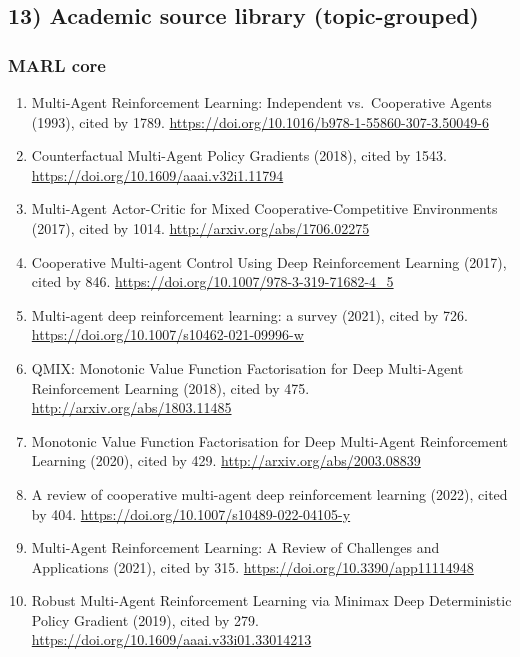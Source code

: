 \documentclass[11pt]{article}
\begin{document}
\hypertarget{academic-source-library-topic-grouped}{%
\subsection{13) Academic source library
(topic-grouped)}\label{academic-source-library-topic-grouped}}

\hypertarget{marl-core}{%
\subsubsection{MARL core}\label{marl-core}}

\begin{enumerate}
\def\labelenumi{\arabic{enumi}.}
\tightlist
\item
  Multi-Agent Reinforcement Learning: Independent vs.~Cooperative Agents
  (1993), cited by 1789.
  \url{https://doi.org/10.1016/b978-1-55860-307-3.50049-6}
\item
  Counterfactual Multi-Agent Policy Gradients (2018), cited by 1543.
  \url{https://doi.org/10.1609/aaai.v32i1.11794}
\item
  Multi-Agent Actor-Critic for Mixed Cooperative-Competitive
  Environments (2017), cited by 1014.
  \url{http://arxiv.org/abs/1706.02275}
\item
  Cooperative Multi-agent Control Using Deep Reinforcement Learning
  (2017), cited by 846.
  \url{https://doi.org/10.1007/978-3-319-71682-4_5}
\item
  Multi-agent deep reinforcement learning: a survey (2021), cited by
  726. \url{https://doi.org/10.1007/s10462-021-09996-w}
\item
  QMIX: Monotonic Value Function Factorisation for Deep Multi-Agent
  Reinforcement Learning (2018), cited by 475.
  \url{http://arxiv.org/abs/1803.11485}
\item
  Monotonic Value Function Factorisation for Deep Multi-Agent
  Reinforcement Learning (2020), cited by 429.
  \url{http://arxiv.org/abs/2003.08839}
\item
  A review of cooperative multi-agent deep reinforcement learning
  (2022), cited by 404. \url{https://doi.org/10.1007/s10489-022-04105-y}
\item
  Multi-Agent Reinforcement Learning: A Review of Challenges and
  Applications (2021), cited by 315.
  \url{https://doi.org/10.3390/app11114948}
\item
  Robust Multi-Agent Reinforcement Learning via Minimax Deep
  Deterministic Policy Gradient (2019), cited by 279.
  \url{https://doi.org/10.1609/aaai.v33i01.33014213}

\end{enumerate}
\end{document}

